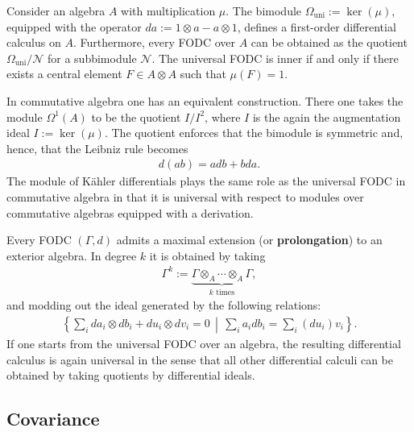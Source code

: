     \begin{example}
        Consider an algebra $A$ with multiplication $\mu$. The bimodule $\Omega_\mathrm{uni}:=\ker(\mu)$, equipped with the operator $da:=1\otimes a-a\otimes1$, defines a first-order differential calculus on $A$. Furthermore, every FODC over $A$ can be obtained as the quotient $\Omega_\mathrm{uni}/\mathcal{N}$ for a subbimodule $\mathcal{N}$. The universal FODC is inner if and only if there exists a central element $F\in A\otimes A$ such that $\mu(F)=1$.
    \end{example}
    \begin{example}
        In commutative algebra one has an equivalent construction. There one takes the module $\Omega^1(A)$ to be the quotient $I/I^2$, where $I$ is the again the augmentation ideal $I:=\ker(\mu)$. The quotient enforces that the bimodule is symmetric and, hence, that the Leibniz rule becomes
        \begin{gather}
            d(ab) = adb + bda.
        \end{gather}
        The module of K\"ahler differentials plays the same role as the universal FODC in commutative algebra in that it is universal with respect to modules over commutative algebras equipped with a derivation.
    \end{example}


    \begin{property}[Prolongation]\label{qa:prolongation}
        Every FODC $(\Gamma,d)$ admits a maximal extension (or \textbf{prolongation}) to an exterior algebra. In degree $k$ it is obtained by taking
        \begin{gather}
            \Gamma^k := \underbrace{\Gamma\otimes_A\cdots\otimes_A\Gamma}_{k\text{ times}},
        \end{gather}
        and modding out the ideal generated by the following relations:
        \begin{gather}
            \left\{\sum_ida_i\otimes db_i+du_i\otimes dv_i=0\,\middle\vert\,\sum_ia_idb_i=\sum_i(du_i)v_i\right\}.
        \end{gather}
        If one starts from the universal FODC over an algebra, the resulting differential calculus is again universal in the sense that all other differential calculi can be obtained by taking quotients by differential ideals.
    \end{property}

\subsection{Covariance}

